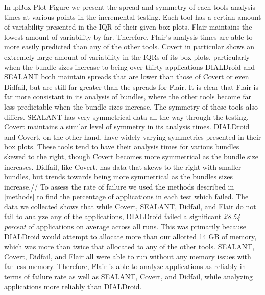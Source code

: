 \documentclass[twocolumn]{article}
\begin{document}
		In \c.p{Box Plot Figure} we present the spread and symmetry of each tools analysis times at various points in the incremental testing. Each tool has a certian amount of variability presented in the IQR of their given box plots. Flair maintains the lowest amount of variability by far. Therefore, Flair's analysis times are able to more easily predicted than any of the other tools. Covert in particular shows an extremely large amount of variability in the IQRs of its box plots, particularly when the bundle sizes increase to being over thirty applications DIALDroid and SEALANT both maintain spreads that are lower than those of Covert or even Didfail, but are still far greater than the spreads for Flair. It is clear that Flair is far more consistant in its analysis of bundles, where the other tools become far less predictable when the bundle sizes increase. The symmetry of these tools also differs. SEALANT has very symmetrical data all the way through the testing. Covert maintains a similar level of symmetry in its analysis times. DIALDroid and Covert, on the other hand, have widely varying symmetries presented in their box plots. These tools tend to have their analysis times for various bundles skewed to the right, though Covert becomes more symmetrical as the bundle size increases. Didfail, like Covert, has data that skews to the right with smaller bundles, but trends towards being more symmetrical as the bundles sizes increase.// 		
		To assess the rate of failure we used the methods described in \ref{methods} to find the percentage of applications in each test which failed. The data we collected shows that while Covert, SEALANT, Didfail, and Flair do not fail to analyze any of the applications, DIALDroid failed a significant \textit{28.54 percent} of applications on average across all runs. This was primarily because DIALDroid would attempt to allocate more than our allotted 14 GB of memory, which was more than twice that allocated to any of the other tools. SEALANT, Covert, Didfail, and Flair all were able to run without any memory issues with far less memory. Therefore, Flair is able to analyze applications as reliably in terms of failure rate as well as SEALANT, Covert, and Didfail, while analyzing applications more reliably than DIALDroid.
		
\end{document}
